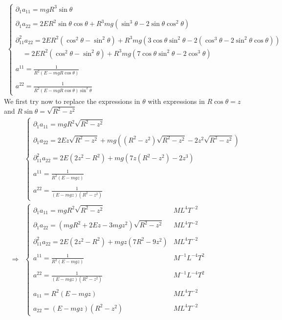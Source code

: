 \begin{align}
\left\{\begin{array}{l}
\partial_1 a_{11} = mgR^3\sin\theta\\\\
\partial_1 a_{22} = 2ER^2\sin\theta\cos\theta+ R^3mg\left(\sin^3\theta-2\sin\theta\cos^2\theta\right)  \\\\
\partial^2_{11} a_{22} =   2ER^2\left(\cos^2\theta- \sin^2\theta\right)+ R^3mg\left(3\cos\theta\sin^2\theta-2\left(\cos^3\theta-2\sin^2\theta\cos\theta\right)  \right)\\
\quad=   2ER^2\left(\cos^2\theta- \sin^2\theta\right)+ R^3mg\left(7\cos\theta\sin^2\theta-2\cos^3\theta  \right)\\\\
a^{11}=\frac{1}{R^2\left(E-mgR\cos\theta\right)}\\\\
a^{22}=\frac{1}{R^2\left(E-mgR\cos\theta\right)\sin^2 \theta }
\end{array}\right.
\end{align}
We first try now to replace the expressions in $\theta$ with expressions in $R\cos\theta=z$ and $R\sin \theta = \sqrt{R^2-z^2}$
\begin{align}
 &
\left\{\begin{array}{l}
\partial_1 a_{11} = mgR^2\sqrt{R^2-z^2}\\\\
\partial_1 a_{22} = 2Ez\sqrt{R^2-z^2}+ mg\left(\left(R^2-z^2\right)\sqrt{R^2-z^2}-2z^2\sqrt{R^2-z^2}\right)\\\\
\partial^2_{11} a_{22} =   2E\left(2z^2-R^2\right)+ mg\left(7z\left(R^2-z^2\right)-2z^3  \right)\\\\
a^{11}=\frac{1}{R^2\left(E-mgz\right)}\\\\
a^{22}=\frac{1}{\left(E-mgz\right)\left(R^2-z^2\right)}
\end{array}\right.\\
\Rightarrow&\left\{\begin{array}{ll}
\partial_1 a_{11} = mgR^2\sqrt{R^2-z^2}&ML^{4}T^{-2}\\\\
\partial_1 a_{22} = \left( mgR^2 +2Ez-3 mgz^2\right) \sqrt{R^2-z^2}&ML^{4}T^{-2}\\\\
\partial^2_{11} a_{22} =   2E\left(2z^2- R^2\right)+ mgz\left(7R^2-9z^2  \right)&ML^{4}T^{-2}\\\\
a^{11}=\frac{1}{R^2\left(E-mgz\right)}&M^{-1}L^{-4}T^{2}\\\\
a^{22}=\frac{1}{\left(E-mgz\right)\left(R^2-z^2\right)}&M^{-1}L^{-4}T^{2}\\\\
a_{11}=R^2\left(E-mgz\right)&ML^{4}T^{-2}\\\\
a_{22}=\left(E-mgz\right)\left(R^2-z^2\right)&ML^{4}T^{-2}
\end{array}\right.
\end{align}
